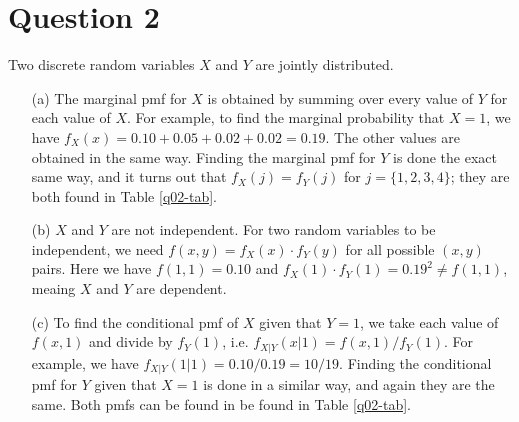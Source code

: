 \documentclass[10pt]{article}
\begin{document}
\section{Question 2} \noindent
Two discrete random variables \(X\) and \(Y\) are jointly distributed. 
\begin{itemize}
    \item[(a)] The marginal pmf for \(X\) is obtained by summing over every value of \(Y\) for each value of \(X\).
    For example, to find the marginal probability that \(X=1\), we have \(f_X(x) = 0.10 + 0.05 + 0.02 + 0.02 = 0.19\). 
    The other values are obtained in the same way. Finding the marginal pmf for \(Y\) is done the exact same way, and 
    it turns out that \(f_X(j) = f_Y(j)\) for \(j = \{1,2,3,4\}\); they are both found in Table \ref{q02-tab}.
    \item[(b)] \(X\) and \(Y\) are not independent. For two random variables to be independent, we need \(f(x,y) = f_X(x)\cdot f_Y(y)\)
    for all possible \((x,y)\) pairs. Here we have \(f(1,1) = 0.10\) and \(f_X(1)\cdot f_Y(1) = 0.19^2 \neq f(1,1)\), meaing 
    \(X\) and \(Y\) are dependent. 
    \item[(c)] To find the conditional pmf of \(X\) given that \(Y=1\), we take each value of \(f(x,1)\) and divide by \(f_Y(1)\), 
    i.e. \(f_{X|Y}(x|1) = f(x,1) / f_Y(1)\). For example, we have \(f_{X|Y}(1|1) = 0.10 / 0.19 = 10/19\). Finding the conditional pmf for 
    \(Y\) given that \(X = 1\) is done in a similar way, and again they are the same. 
    Both pmfs can be found in be found in Table \ref{q02-tab}.
\end{itemize}

\end{document}
